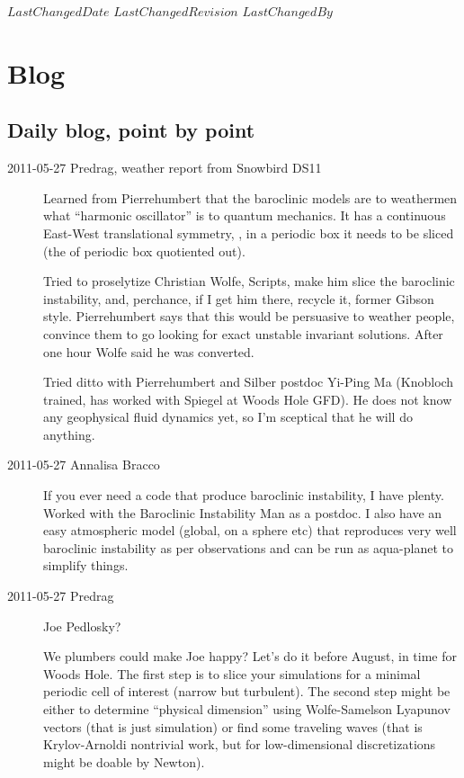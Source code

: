 {$LastChangedDate$}
{$LastChangedRevision$} {$LastChangedBy$}

\chapter{Blog}
\label{chap:dailyBlog}

\section{Daily blog, point by point}
\label{sect:blogBaroclin}


\begin{description}

\item[2011-05-27 Predrag, weather report from Snowbird DS11]
	\toCB
Learned from Pierrehumbert that the baroclinic models are to weathermen
what ``harmonic oscillator'' is to quantum mechanics. It has a continuous
East-West translational symmetry, \ie, in a periodic box it needs to be
sliced (the  of periodic box quotiented out).

Tried to proselytize Christian Wolfe, Scripts,  make him slice
the baroclinic instability, and, perchance, if I get him there, recycle
it, former Gibson style. Pierrehumbert says that this would be persuasive
to weather people, convince them to go looking for exact unstable
invariant solutions. After one hour Wolfe said he was converted.

Tried ditto with Pierrehumbert and Silber postdoc Yi-Ping Ma (Knobloch
trained, has worked with Spiegel at Woods Hole GFD). He does not know any
geophysical fluid dynamics yet, so I'm sceptical that he will do anything.

\item[2011-05-27 Annalisa Bracco]
If you ever need a code that produce baroclinic instability, I have
plenty. Worked with the Baroclinic Instability Man as a postdoc. I also
have an easy atmospheric model (global, on a sphere etc) that reproduces
very well baroclinic instability as per observations and can be run as
aqua-planet to simplify things.

\item[2011-05-27 Predrag]
Joe Pedlosky?


We plumbers could make Joe happy? Let's do it before
August, in time for Woods Hole. The first step is to slice your
simulations for a minimal periodic cell of interest (narrow but
turbulent). The second step might be either to determine ``physical
dimension'' using Wolfe-Samelson Lyapunov vectors (that is
just simulation) or find some traveling waves (that is Krylov-Arnoldi
nontrivial work, but for low-dimensional discretizations might be doable
by Newton).


\end{description}
